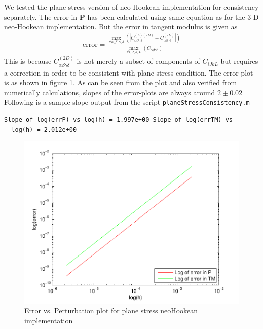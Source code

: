 \documentclass[../main.tex]{subfiles}
\begin{document}
We tested the plane-stress version of neo-Hookean implementation for
consistency separately. The error in $\mathbf{P}$ has been calculated
using same equation as for the 3-D neo-Hookean implementation. But the
error in tangent modulus is given as
\begin{align*}
  \text{error} =\frac{\underset{\forall \alpha,\beta,\gamma,\delta}{\max}\left(|C^{(h)(2D)}_{\alpha\beta\gamma\delta}-C^{(2D)}_{\alpha\beta\gamma\delta}|\right)}{\underset{\forall i,J,k,L}{\max}\left(C_{\alpha\beta\gamma\delta}\right)}
\end{align*}
This is because $C^{(2D)}_{\alpha\beta\gamma\delta}$ is not merely a
subset of components of $C_{iJkL}$ but requires a correction in order
to be consistent with plane stress condition. The error plot is as
shown in figure \ref{fig:psneoHcon}. As can be seen from the plot and
also verified from numerically calculations, slopes of the error-plots
are always around $2\pm0.02$ Following is a sample slope output from
the script \texttt{planeStressConsistency.m}
\begin{lstlisting}[frame=single]
  Slope of log(errP) vs log(h) = 1.997e+00 Slope of log(errTM) vs
  log(h) = 2.012e+00
\end{lstlisting}
\begin{figure}[h]
  \centering
  \includegraphics{./img/planeStressConsistency.pdf}
  \caption{Error vs. Perturbation plot for plane stress neoHookean
    implementation}
  \label{fig:psneoHcon}
\end{figure}
\end{document}

